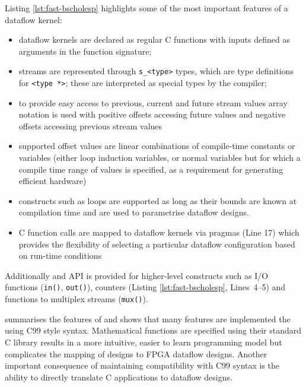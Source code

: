 Listing \ref{lst:fast-bscholesp} highlights some of the most important
features of a \FAST{} dataflow kernel:
\begin{itemize}
\item dataflow kernels are declared as regular C functions with inputs
  defined as arguments in the function signature;
\item streams are represented through \texttt{s\_<type>} types, which
  are type definitions for \texttt{<type *>}; these are interpreted
  as special types by the \fastc{} compiler;
\item to provide easy access to previous, current and future stream
  values array notation is used with positive offsets accessing future
  values and negative offsets accessing previous stream values
\item supported offset values are linear combinations of compile-time
  constants or variables (either loop induction variables,
  or normal variables but for which a compile time range of values is
  specified, as a requirement for generating efficient hardware)
\item constructs such as loops are supported as long as their bounds
  are known at compilation time and are used to parametrise dataflow
  designs.
\item C function calls are mapped to dataflow kernels via pragmas
  (Line 17) which provides the flexibility of selecting a particular
  dataflow configuration based on run-time conditions
\end{itemize}


Additionally and API is provided for higher-level constructs such as
I/O functions (\texttt{in()}, \texttt{out()}), counters
(Listing \ref{lst:fast-bscholesp}, Lines~4--5) and functions to multiplex
streams (\texttt{mux()}).

 summarises the features of \FAST{} and
shows that many features are implemented the using C99 style
syntax. Mathematical functions are specified using their standard C
library results in a more intuitive, easier to learn programming model
but complicates the mapping of \FAST{} designs to FPGA dataflow
designs. Another important consequence of maintaining compatibility
with C99 syntax is the ability to directly translate C applications to
dataflow designs.


